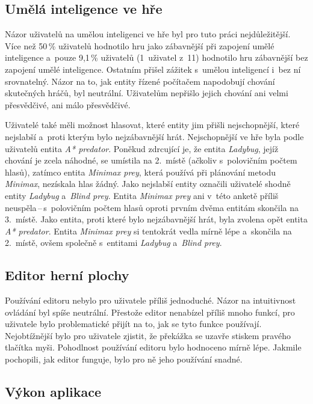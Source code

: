 \subsection*{Umělá inteligence ve hře}

Názor uživatelů na umělou inteligenci ve hře byl pro tuto práci nejdůležitější. Více než 50\,\% uživatelů hodnotilo hru jako zábavnější při zapojení umělé inteligence a~pouze 9,1\,\% uživatelů (1~uživatel z~11) hodnotilo hru zábavnější bez zapojení umělé inteligence. Ostatním přišel zážitek s~umělou inteligencí i~bez ní srovnatelný. Názor na to, jak entity řízené počítačem napodobují chování skutečných hráčů, byl neutrální. Uživatelům nepřišlo jejich chování ani velmi přesvědčivé, ani málo přesvědčivé.

Uživatelé také měli možnost hlasovat, které entity jim přišli nejschopnější, které nejslabší a~proti kterým bylo nejzábavnější hrát. Nejschopnější ve hře byla podle uživatelů entita \emph{A* predator}. Poněkud zdrcující je, že entita \emph{Ladybug}, jejíž chování je zcela náhodné, se umístila na 2.~místě (ačkoliv s~polovičním počtem hlasů), zatímco entita \emph{Minimax prey}, která používá při plánování metodu \emph{Minimax}, nezískala hlas žádný. Jako nejslabší entity označili uživatelé shodně entity \emph{Ladybug} a~\emph{Blind prey}. Entita \emph{Minimax prey} ani v~této anketě příliš neuspěla\,--\,s~polovičním počtem hlasů oproti prvním dvěma entitám skončila na 3.~místě. Jako entita, proti které bylo nejzábavnější hrát, byla zvolena opět entita \emph{A* predator}. Entita \emph{Minimax prey} si tentokrát vedla mírně lépe a~skončila na 2.~místě, ovšem společně s~entitami \emph{Ladybug} a~\emph{Blind prey}.

\subsection*{Editor herní plochy}

Používání editoru nebylo pro uživatele příliš jednoduché. Názor na intuitivnost ovládání byl spíše neutrální. Přestože editor nenabízel příliš mnoho funkcí, pro uživatele bylo problematické přijít na to, jak se tyto funkce používají. Nejobtížnější bylo pro uživatele zjistit, že překážka se uzavře stiskem pravého tlačítka myši. Pohodlnost používání editoru bylo hodnoceno mírně lépe. Jakmile pochopili, jak editor funguje, bylo pro ně jeho používání snadné.

\subsection*{Výkon aplikace}

